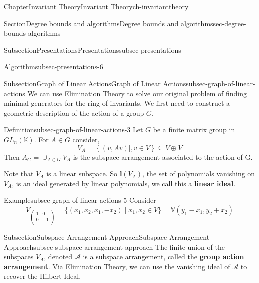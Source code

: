 \documentclass[oneside,10pt,]{book}
\newcommand{\terminology}[1]{\textbf{#1}}
\newcommand{\amp}{&}
\begin{document}
\begin{chapterptx}{Chapter}{Invariant Theory}{}{Invariant Theory}{}{}{ch-invarianttheory}
\begin{sectionptx}{Section}{Degree bounds and algorithms}{}{Degree bounds and algorithms}{}{}{sec-degree-bounds-algorithms}
\begin{subsectionptx}{Subsection}{Presentations}{}{Presentations}{}{}{subsec-presentations}
\begin{algorithm}{Algorithm}{}{}{subsec-presentations-6}
\end{algorithm}
\end{subsectionptx}
%
%
\typeout{************************************************}
\typeout{************************************************}
%
\begin{subsectionptx}{Subsection}{Graph of Linear Actions}{}{Graph of Linear Actions}{}{}{subsec-graph-of-linear-actions}
We can use Elimination Theory to solve our original problem of finding minimal generators for the ring of invariants. We first need to construct a geometric description of the action of a group \(G\).%
\begin{definition}{Definition}{}{subsec-graph-of-linear-actions-3}%
Let \(G\) be a finite matrix group in \(GL_n(\mathbb{K})\). For \(A\in G\) consider,%
\begin{equation*}
V_A = \left\{ ( \bar v, A \bar v) \mid ,v \in V \right \} \subseteq V \oplus V 
\end{equation*}
Then \(A_G = \cup_{A\in G}V_A\) is the subspace arrangement associated to the action of G.%
\end{definition}
Note that \(V_A\) is a linear subspace. So \(\mathbb{I}(V_A)\), the set of polynomials vanishing on \(V_A\), is an ideal generated by linear polynomials, we call this a \terminology{linear ideal}.%
\begin{example}{Example}{}{subsec-graph-of-linear-actions-5}%
Consider%
\begin{equation*}
V_{\begin{pmatrix}
1 \amp 0 \\
0 \amp -1 \\
\end{pmatrix}} = \{(x_1,x_2,x_1,-x_2) \mid x_1, x_2 \in V\} = \mathbb{V}(y_1-x_1, y_2+x_2)
\end{equation*}
%
\end{example}
\end{subsectionptx}
%
%
\typeout{************************************************}
\typeout{************************************************}
%
\begin{subsectionptx}{Subsection}{Subspace Arrangement Approach}{}{Subspace Arrangement Approach}{}{}{subsec-subspace-arrangement-approach}
The finite union of the subspaces \(V_A\), denoted \(\mathcal{A}\) is a subspace arrangement, called the \terminology{group action arrangement}. Via Elimination Theory, we can use the vanishing ideal of \(\mathcal{A}\) to recover the Hilbert Ideal.%

\end{subsectionptx}
\end{sectionptx}
\end{chapterptx}
\end{document}
